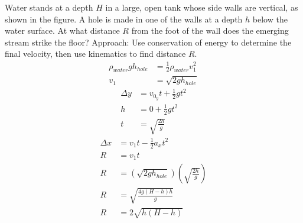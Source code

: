 \documentclass{article}
\begin{document}
Water stands at a depth $ H $ in a large, open tank whose side walls are vertical, as shown in the figure. A hole is made in one of the walls at a depth $ h $ below the water surface. At what distance $ R $ from the foot of the wall does the emerging stream strike the floor?
Approach: Use conservation of energy to determine the final velocity, then use kinematics to find distance $ R $.
\begin{align*}
	\rho_{water}gh_{hole} & = \frac{1}{2}\rho_{water}v_1^2 \\
	v_1 & = \sqrt{ 2gh_{hole} }
\end{align*}
\begin{align*}
	\Delta y & = v_{0_y}t + \frac{1}{2}gt^2 \\
	h & = 0 + \frac{1}{2}gt^2 \\
	t & = \sqrt{ \frac{ 2h }{ g } }
\end{align*}
\begin{align*}
	\Delta x & = v_1t - \frac{1}{2}a_xt^2 \\
	R & = v_1t \\
	R & = (\sqrt{ 2gh_{hole} }) \left( \sqrt{ \frac{ 2h }{ g } } \right) \\
	R & = \sqrt{ \frac{ 4g(H - h)h }{ g } } \\
	R & = 2\sqrt{ h(H - h) }
\end{align*}
\end{document}
